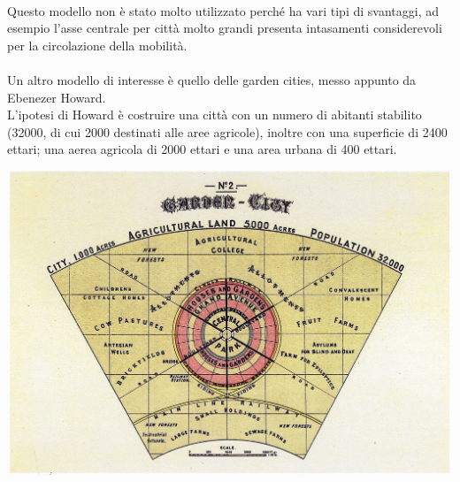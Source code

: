 \documentclass[a4paper,12pt, oneside]{book}
\begin{document}
   \leavevmode\\
   Questo modello non è stato molto utilizzato perché ha vari tipi di svantaggi, ad esempio l'asse centrale per città molto grandi presenta intasamenti considerevoli per la circolazione della mobilità.\\ \\
   Un altro modello di interesse è quello delle garden cities, messo appunto da Ebenezer Howard.\\
   L'ipotesi di Howard è costruire una città con un numero di abitanti stabilito (32000, di cui 2000 destinati alle aree agricole), inoltre con una superficie di 2400 ettari; una aerea agricola di 2000 ettari e una area urbana di 400 ettari.\\
   \begin{center}
   	\includegraphics[width=0.8\linewidth]{"immagini/garden cities"}
   	\label{fig:garden cities}
   \end{center}
   \leavevmode\\
   
   
    
    
\end{document}
